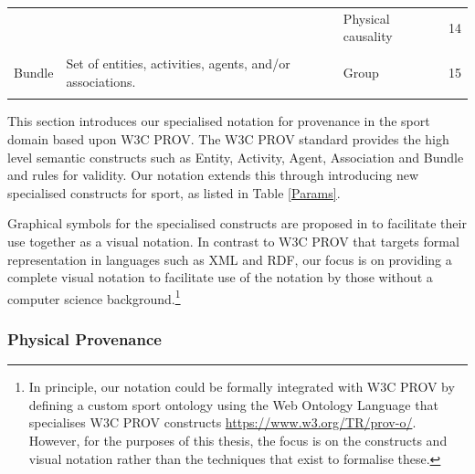 \begin{table}[!htb]
\begin{tabular}{p{2.2cm}p{5cm}p{4cm}r}
                             &                                                                                                                                & Physical causality                                                                              & 14 \\
\rule{0pt}{6.5ex}\\
\midrule
\multirow{1}{*}{Bundle}      & \multirow{1}{5cm}{Set of entities, activities, agents, and/or associations.}                                                    & Group                                                                                           & 15 \\
\rule{0pt}{4.5ex}\\
\bottomrule
\end{tabular}
\end{table}

This section introduces our specialised notation for provenance in the sport domain based upon W3C PROV. The W3C PROV standard provides the high level semantic constructs such as Entity, Activity, Agent, Association and Bundle and rules for validity. Our notation extends this through introducing new specialised constructs for sport, as listed in Table \ref{Params}.

Graphical symbols for the specialised constructs are proposed in  to facilitate their use together as a visual notation. In contrast to W3C PROV that targets formal representation in languages such as XML and RDF, our focus is on providing a complete visual notation to facilitate use of the notation by those without a computer science background.\footnote{In principle, our notation could be formally integrated with W3C PROV by defining a custom sport ontology using the Web Ontology Language that specialises W3C PROV constructs \url{https://www.w3.org/TR/prov-o/}. However, for the purposes of this thesis, the focus is on the constructs and visual notation rather than the techniques that exist to formalise these.}

\subsubsection{Physical Provenance}

{}

